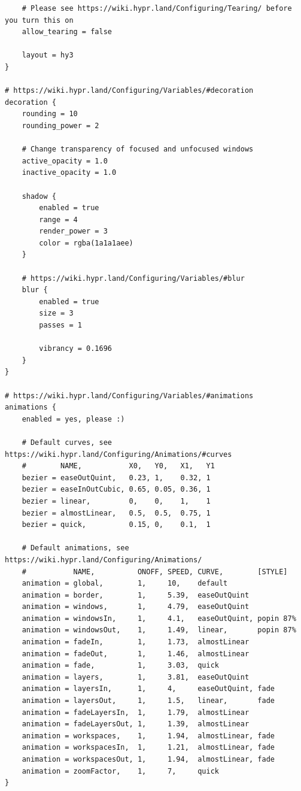 \documentclass[11pt]{article}
\begin{document}
\begin{verbatim}
    # Please see https://wiki.hypr.land/Configuring/Tearing/ before you turn this on
    allow_tearing = false

    layout = hy3
}

# https://wiki.hypr.land/Configuring/Variables/#decoration
decoration {
    rounding = 10
    rounding_power = 2

    # Change transparency of focused and unfocused windows
    active_opacity = 1.0
    inactive_opacity = 1.0

    shadow {
        enabled = true
        range = 4
        render_power = 3
        color = rgba(1a1a1aee)
    }

    # https://wiki.hypr.land/Configuring/Variables/#blur
    blur {
        enabled = true
        size = 3
        passes = 1

        vibrancy = 0.1696
    }
}

# https://wiki.hypr.land/Configuring/Variables/#animations
animations {
    enabled = yes, please :)

    # Default curves, see https://wiki.hypr.land/Configuring/Animations/#curves
    #        NAME,           X0,   Y0,   X1,   Y1
    bezier = easeOutQuint,   0.23, 1,    0.32, 1
    bezier = easeInOutCubic, 0.65, 0.05, 0.36, 1
    bezier = linear,         0,    0,    1,    1
    bezier = almostLinear,   0.5,  0.5,  0.75, 1
    bezier = quick,          0.15, 0,    0.1,  1

    # Default animations, see https://wiki.hypr.land/Configuring/Animations/
    #           NAME,          ONOFF, SPEED, CURVE,        [STYLE]
    animation = global,        1,     10,    default
    animation = border,        1,     5.39,  easeOutQuint
    animation = windows,       1,     4.79,  easeOutQuint
    animation = windowsIn,     1,     4.1,   easeOutQuint, popin 87%
    animation = windowsOut,    1,     1.49,  linear,       popin 87%
    animation = fadeIn,        1,     1.73,  almostLinear
    animation = fadeOut,       1,     1.46,  almostLinear
    animation = fade,          1,     3.03,  quick
    animation = layers,        1,     3.81,  easeOutQuint
    animation = layersIn,      1,     4,     easeOutQuint, fade
    animation = layersOut,     1,     1.5,   linear,       fade
    animation = fadeLayersIn,  1,     1.79,  almostLinear
    animation = fadeLayersOut, 1,     1.39,  almostLinear
    animation = workspaces,    1,     1.94,  almostLinear, fade
    animation = workspacesIn,  1,     1.21,  almostLinear, fade
    animation = workspacesOut, 1,     1.94,  almostLinear, fade
    animation = zoomFactor,    1,     7,     quick
}


\end{verbatim}
\end{document}
